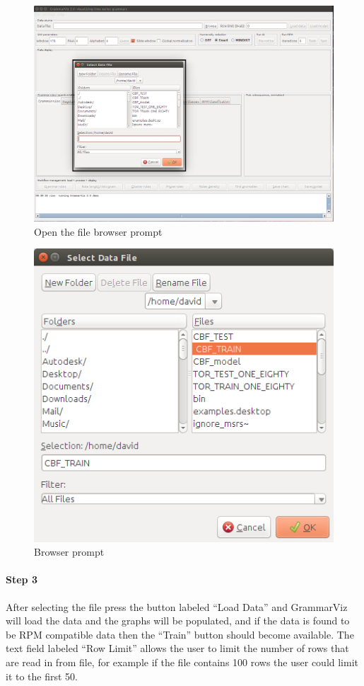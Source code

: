 \documentclass[letterpaper, 12pt]{article}
\begin{document}
\begin{figure}[H]
  \includegraphics[width=\textwidth]{grammarviz-training-step-2}
  \caption{Open the file browser prompt}
  \label{fig:grammarviz-training-step-2}
\end{figure}
\begin{figure}[H]
  \center
  \includegraphics[width=.4\textwidth]{grammarviz-training-step-3}
  \caption{Browser prompt}
  \label{fig:grammarviz-training-step-3}
\end{figure}

\newpage
\paragraph{Step 3}
After selecting the file press the button labeled ``Load Data'' and  GrammarViz will load the data and the graphs will be populated, and if the data is found to be RPM compatible data then the ``Train'' button should become available. The text field labeled ``Row Limit'' allows the user to limit the number of rows that are read in from file, for example if the file contains 100 rows the user could limit it to the first 50. 
\end{document}
